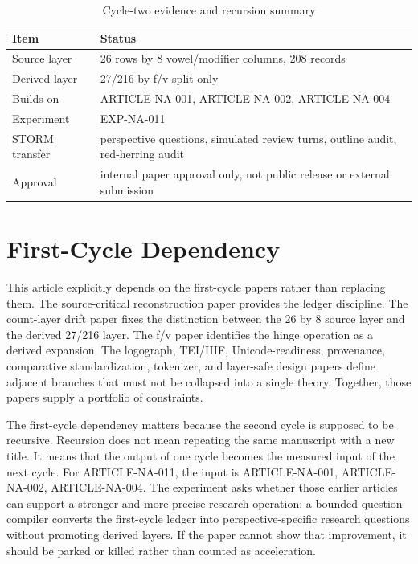 \documentclass[sigconf,nonacm]{acmart}
\begin{document}
\begin{table}[t]
\caption{Cycle-two evidence and recursion summary}
\label{tab:cycle2}
\begin{tabular}{p{}p{}}
\toprule
Item & Status \\
\midrule
Source layer & 26 rows by 8 vowel/modifier columns, 208 records \\
Derived layer & 27/216 by f/v split only \\
Builds on & ARTICLE-NA-001, ARTICLE-NA-002, ARTICLE-NA-004 \\
Experiment & EXP-NA-011 \\
STORM transfer & perspective questions, simulated review turns, outline audit, red-herring audit \\
Approval & internal paper approval only, not public release or external submission \\
\bottomrule
\end{tabular}
\end{table}


\section{First-Cycle Dependency}
This article explicitly depends on the first-cycle papers rather than replacing
them. The source-critical reconstruction paper provides the ledger discipline.
The count-layer drift paper fixes the distinction between the 26 by 8 source
layer and the derived 27/216 layer. The f/v paper identifies the hinge operation
as a derived expansion. The logograph, TEI/IIIF, Unicode-readiness, provenance,
comparative standardization, tokenizer, and layer-safe design papers define
adjacent branches that must not be collapsed into a single theory. Together,
those papers supply a portfolio of constraints.

The first-cycle dependency matters because the second cycle is supposed to be
recursive. Recursion does not mean repeating the same manuscript with a new
title. It means that the output of one cycle becomes the measured input of the
next cycle. For ARTICLE-NA-011, the input is ARTICLE-NA-001, ARTICLE-NA-002, ARTICLE-NA-004. The experiment asks
whether those earlier articles can support a stronger and more precise research
operation: a bounded question compiler converts the first-cycle ledger into perspective-specific research questions without promoting derived layers. If the paper cannot show that improvement, it should be
parked or killed rather than counted as acceleration.
\end{document}
